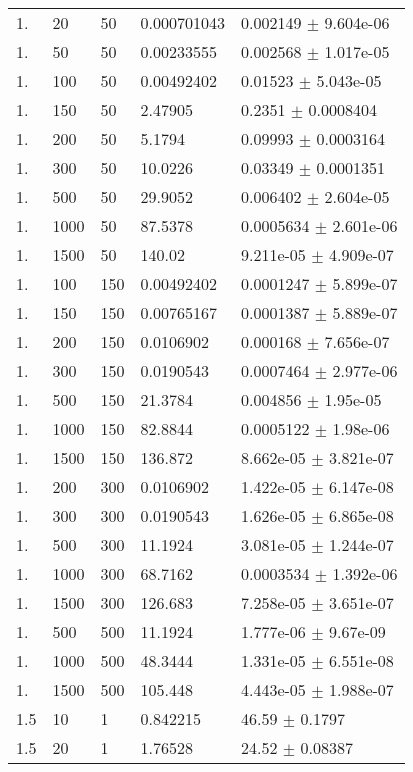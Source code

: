 \begin{longtable}{lllll}
  1. &    20 &    50 & 0.000701043 & 0.002149 $\pm$ 9.604e-06 \\
  1. &    50 &    50 & 0.00233555 & 0.002568 $\pm$ 1.017e-05 \\
  1. &   100 &    50 & 0.00492402 &  0.01523 $\pm$ 5.043e-05 \\
  1. &   150 &    50 &  2.47905 &   0.2351 $\pm$ 0.0008404 \\
  1. &   200 &    50 &   5.1794 &  0.09993 $\pm$ 0.0003164 \\
  1. &   300 &    50 &  10.0226 &  0.03349 $\pm$ 0.0001351 \\
  1. &   500 &    50 &  29.9052 & 0.006402 $\pm$ 2.604e-05 \\
  1. &  1000 &    50 &  87.5378 & 0.0005634 $\pm$ 2.601e-06 \\
  1. &  1500 &    50 &   140.02 & 9.211e-05 $\pm$ 4.909e-07 \\
  1. &   100 &   150 & 0.00492402 & 0.0001247 $\pm$ 5.899e-07 \\
  1. &   150 &   150 & 0.00765167 & 0.0001387 $\pm$ 5.889e-07 \\
  1. &   200 &   150 & 0.0106902 & 0.000168 $\pm$ 7.656e-07 \\
  1. &   300 &   150 & 0.0190543 & 0.0007464 $\pm$ 2.977e-06 \\
  1. &   500 &   150 &  21.3784 & 0.004856 $\pm$ 1.95e-05 \\
  1. &  1000 &   150 &  82.8844 & 0.0005122 $\pm$ 1.98e-06 \\
  1. &  1500 &   150 &  136.872 & 8.662e-05 $\pm$ 3.821e-07 \\
  1. &   200 &   300 & 0.0106902 & 1.422e-05 $\pm$ 6.147e-08 \\
  1. &   300 &   300 & 0.0190543 & 1.626e-05 $\pm$ 6.865e-08 \\
  1. &   500 &   300 &  11.1924 & 3.081e-05 $\pm$ 1.244e-07 \\
  1. &  1000 &   300 &  68.7162 & 0.0003534 $\pm$ 1.392e-06 \\
  1. &  1500 &   300 &  126.683 & 7.258e-05 $\pm$ 3.651e-07 \\
  1. &   500 &   500 &  11.1924 & 1.777e-06 $\pm$ 9.67e-09 \\
  1. &  1000 &   500 &  48.3444 & 1.331e-05 $\pm$ 6.551e-08 \\
  1. &  1500 &   500 &  105.448 & 4.443e-05 $\pm$ 1.988e-07 \\
 1.5 &    10 &     1 & 0.842215 &    46.59 $\pm$   0.1797 \\
 1.5 &    20 &     1 &  1.76528 &    24.52 $\pm$  0.08387 \\

\end{longtable}
